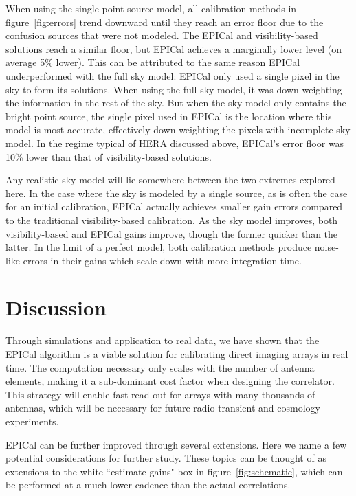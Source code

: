 \documentclass[a4paper,fleqn,usenatbib]{mnras}
\begin{document}
When using the single point source model, all calibration methods in figure~\ref{fig:errors} trend 
downward until they reach an error floor due to the confusion sources that were not modeled. 
The EPICal and visibility-based solutions reach a similar floor, but EPICal achieves a 
marginally lower level (on average 5\% lower). This can be attributed to the same reason 
EPICal underperformed with the full sky model: EPICal only used a single pixel in the sky to 
form its solutions. When using the full sky model, it was down weighting the information in the 
rest of the sky. But when the sky model only contains the bright point source, the single pixel 
used in EPICal is the location where this model is most accurate, effectively down weighting 
the pixels with incomplete sky model. In the regime typical of HERA discussed above, EPICal's 
error floor was 10\% lower than that of visibility-based solutions.

Any realistic sky model will lie somewhere between the two extremes explored here. In the 
case where the sky is modeled by a single source, as is often the case for an initial calibration, 
EPICal actually achieves smaller gain errors compared to the traditional visibility-based 
calibration. As the sky model improves, both visibility-based and EPICal gains improve, though 
the former quicker than the latter. In the limit of a perfect model, both calibration methods 
produce noise-like errors in their gains which scale down with more integration time.

\section{Discussion}\label{sec:discussion}
Through simulations and application to real data, we have shown that the EPICal algorithm is a 
viable solution for calibrating direct imaging arrays in real time. The computation necessary 
only scales with the number of antenna elements, making it a sub-dominant cost factor when 
designing the correlator. This strategy will enable fast read-out for arrays with many thousands 
of antennas, which will be necessary for future radio transient and cosmology experiments.

EPICal can be further improved through several extensions. Here we name a few potential 
considerations for further study. These topics can be thought of as extensions to the white 
``estimate gains" box in figure~\ref{fig:schematic}, which can be performed at a much lower 
cadence than the actual correlations.
\end{document}
